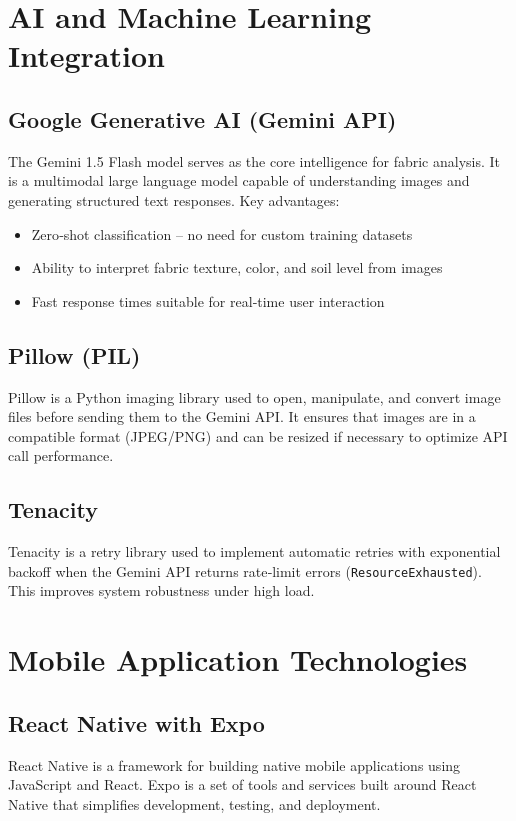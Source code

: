 \section{AI and Machine Learning Integration}

\subsection{Google Generative AI (Gemini API)}
The Gemini 1.5 Flash model serves as the core intelligence for fabric analysis. It is a multimodal large language model capable of understanding images and generating structured text responses. Key advantages:
\begin{itemize}
    \item Zero‑shot classification – no need for custom training datasets
    \item Ability to interpret fabric texture, color, and soil level from images
    \item Fast response times suitable for real‑time user interaction
\end{itemize}

\subsection{Pillow (PIL)}
Pillow is a Python imaging library used to open, manipulate, and convert image files before sending them to the Gemini API. It ensures that images are in a compatible format (JPEG/PNG) and can be resized if necessary to optimize API call performance.

\subsection{Tenacity}
Tenacity is a retry library used to implement automatic retries with exponential backoff when the Gemini API returns rate‑limit errors (\texttt{ResourceExhausted}). This improves system robustness under high load.

\section{Mobile Application Technologies}

\subsection{React Native with Expo}
React Native is a framework for building native mobile applications using JavaScript and React. Expo is a set of tools and services built around React Native that simplifies development, testing, and deployment.

